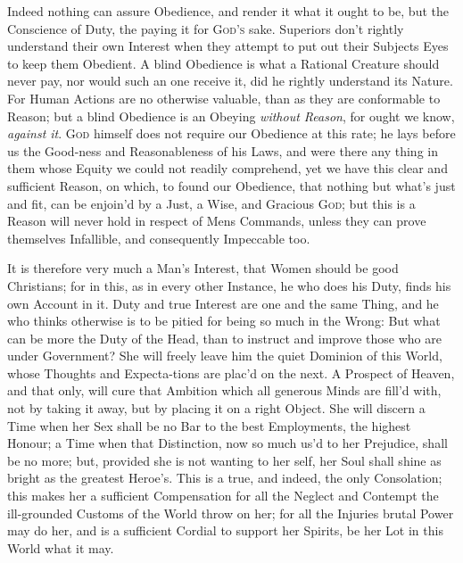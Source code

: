 Indeed nothing can assure Obedience, and render it what it ought to
be, but the Conscience of Duty, the paying it for \textsc{God's} sake.
Superiors don't rightly understand their own Interest when they
attempt to put out their Subjects Eyes to keep them Obedient. A blind
Obedience is what a Rational Creature should never pay, nor would such
an one receive it, did he rightly understand its Nature. For Human
Actions are no otherwise valuable, than as they are conformable to
Reason; but a blind Obedience is an Obeying \textit{without Reason},
for ought we know, \textit{against it}. \textsc{God} himself does not
require our Obedience at this rate; he lays before us the
Good-ness and Reasonableness of his Laws, and were there any
thing in them whose Equity we could not readily comprehend, yet we
have this clear and sufficient Reason, on which, to found our
Obedience, that nothing but what's just and fit, can be enjoin'd by a
Just, a Wise, and Gracious \textsc{God}; but this is a Reason will
never hold in respect of Mens Commands, unless they can prove
themselves Infallible, and consequently Impeccable too.

It is therefore very much a Man's Interest, that Women should be good
Christians; for in this, as in every other Instance, he who does his
Duty, finds his own Account in it. Duty and true Interest are one and
the same Thing, and he who thinks otherwise is to be pitied for being
so much in the Wrong: But what can be more the Duty of the Head, than
to instruct and improve those who are under Government? She will
freely leave him the quiet Dominion of this World, whose Thoughts and
Expecta-tions are plac'd on the next. A Prospect of Heaven,
and that only, will cure that Ambition which all generous Minds are
fill'd with, not by taking it away, but by placing it on a right
Object. She will discern a Time when her Sex shall be no Bar to the
best Employments, the highest Honour; a Time when that Distinction,
now so much us'd to her Prejudice, shall be no more; but, provided she
is not wanting to her self, her Soul shall shine as bright as the
greatest Heroe's. This is a true, and indeed, the only Consolation;
this makes her a sufficient Compensation for all the Neglect and
Contempt the ill-grounded Customs of the World throw on her; for all
the Injuries brutal Power may do her, and is a sufficient Cordial to
support her Spirits, be her Lot in this World what it may.

